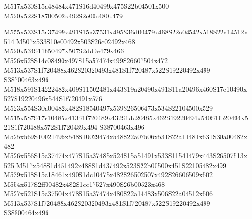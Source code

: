 \documentclass{article}
\begin{document}
\begin{multicols}{2}
\begin{center}
M517x530S15a48484x471S16d40499x475S22b04501x500 M520x522S18700502x492S2e00e480x479 
\end{center}







M555x533S15a37499x491S15a37531x495S36d00479x468S22a04542x518S22a14512x514 M507x533S10e00492x503S26c02492x468 M520x534S11850497x507S2dd0e479x466 M526x528S14c08490x497S15a57474x499S26607504x472 M513x537S1f720488x462S20320493x481S1f720487x522S19220492x499 S38700463x496 M518x591S14222482x409S11502481x443S19a20490x491S11a20496x460S17e10490x527S19220496x544S1f720491x576 M523x554S30a00482x482S18540497x539S26506473x534S22104500x529 M515x587S17e10485x413S1f720489x432S1dc20485x462S19220494x540S1fb20494x521S1f720488x572S1f720489x494 S38700463x496 M525x569S10021495x548S10029474x548S22a07506x531S22a11481x531S30a00482x482 M526x556S15a37474x477S15a37485x524S15a51491x533S11541479x443S26507513x525 M517x548S1d451492x488S1d437492x523S22b00500x451S22105482x499 M539x518S15a18461x490S1dc10475x482S26502507x492S26606509x502 M554x517S2ff00482x482S1ce17527x490S26b00523x468 M527x521S15a37504x478S15a37474x480S22a14483x506S22a04512x506 M513x537S1f720488x462S20320493x481S1f720487x522S19220492x499 S38800464x496




\end{multicols}
\end{document}
